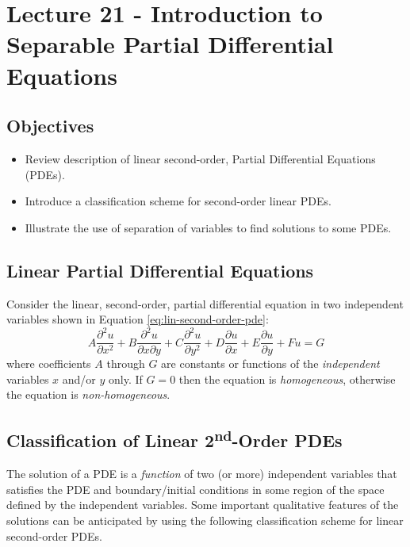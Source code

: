 \chapter{Lecture 21 - Introduction to Separable Partial Differential Equations}
\label{ch:lec21}
\section{Objectives}
\begin{itemize}
\item Review description of linear second-order, Partial Differential Equations (PDEs).
\item Introduce a classification scheme for second-order linear PDEs.
\item Illustrate the use of separation of variables to find solutions to some PDEs.
\end{itemize}

\section{Linear Partial Differential Equations}

Consider the linear, second-order, partial differential equation in two independent variables shown in Equation \ref{eq:lin-second-order-pde}:
\begin{equation}
A\frac{\partial^2u}{\partial x^2} + B\frac{\partial^2 u}{\partial x \partial y} + C\frac{\partial^2 u}{\partial y^2} + D \frac{\partial u}{\partial x} + E\frac{\partial u}{\partial y} + Fu = G
\label{eq:lin-second-order-pde}
\end{equation}
where coefficients $A$ through $G$ are constants or functions of the \emph{independent} variables $x$ and/or $y$ only.  If $G=0$ then the equation is \emph{homogeneous}, otherwise the equation is \emph{non-homogeneous}.

\section{Classification of Linear 2\textsuperscript{nd}-Order PDEs}
The solution of a PDE is a \emph{function} of two (or more) independent variables that satisfies the PDE and boundary/initial conditions in some region of the space defined by the independent variables.  Some important qualitative features of the solutions can be anticipated by using the following classification scheme for linear second-order PDEs.

